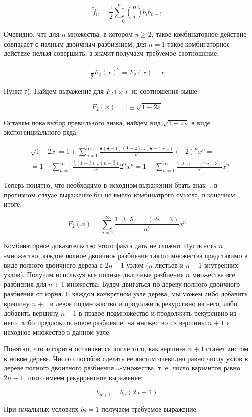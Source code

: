 \documentclass[a4paper,12pt]{article}
\begin{document}
\begin{Solution}
\[
	\tilde f_n = \frac{1}{2} \sum_{i = 0} ^n \binom{n}{i} b_i b_{n-i}
\]

Очевидно, что для $n$-множества, в котором $n\ge2$, такое комбинаторное действие совпадает с полным двоичным разбиением, для $n=1$ такое комбинаторное действие нельзя совершить, а значит получаем требуемое соотношение:

\[
	\frac{1}{2} F_2\left(x\right)^2 = F_2\left(x\right) - x
\]

Пункт г). Найдем выражение для $F_2\left(x\right)$ из соотношения выше:

\[
	F_2\left(x\right) = 1 \pm \sqrt{1 - 2x}
\]

Оставим пока выбор правильного знака, найдем вид $\sqrt{1 - 2x}$ в виде экспоненциального ряда:

\[
	\begin{split}
		& \sqrt{1 - 2x} = 1 + \sum_{n=1}^{\infty} \frac{\frac{1}{2}\left(\frac{1}{2} - 1\right)\left(\frac{1}{2} - 2\right)...\left(\frac{1}{2}-n+1\right)}{n!} \left(-2\right)^n x^n = \\
		& = 1 - \sum_{n=1}^{\infty} \frac{\frac{1}{2}\left(1-\frac{1}{2}\right)...\left(n - \frac{3}{2}\right)}{n!} 2^n x^n = 1 - \sum_{n=1}^{\infty} \frac{1\cdot3\cdot5\cdot...\cdot\left(2n-3\right)}{n!}x^n
	\end{split}
\]

Теперь понятно, что необходимо в исходном выражении брать знак -, в противном слчуае выражение бы не имело комбинатрого смысла, в конечном итоге:

\[
	F_2\left(x\right) = \sum_{n=1}^{\infty} \frac{1\cdot3\cdot5\cdot...\cdot\left(2n-3\right)}{n!} x^n
\]

Комбинаторное доказательство этого факта дать не сложно. Пусть есть $n$-множество, каждое полное двоичное разбиение такого множества представимо в виде полного двоичного дерева с $2n - 1$ узлом ($n$-листьев и $n-1$ внутренних узлов). Получим используя все полные двличные разбиения $n$ множества все разбиения для $n+1$-множества. Будем двигаться по дереву полного двоичного разбиения от корня. В каждом конкретном узле дерева, мы можем либо добавить врешину $n+1$ в левое подмножество и продолжить рекурсивно из него, либо добавить вершину $n+1$ в правое подмножество и продолжить рекурсивно из него, либо предложить новое разбиение, на множество из вершины $n+1$ и исходное множество в данном узле.

Понятно, что алгоритм остановится после того, как вершина $n+1$ станет листом в новом дереве. Число способов сделать ее листом очевидно равно числу узлов в дереве полного двоичного разбиения $n$-множества, т. е. число вариантов равно $2n-1$, итого имеем рекуррентное выражение:

\[
	b_{n+1} = b_n \left(2n-1\right)
\]

При начальных условиях $b_2 = 1$ получаем требуемое выражение.
\end{Solution}
\end{document}
